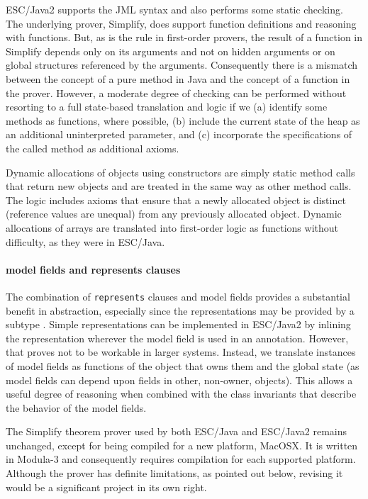 \documentclass{llncs}
\begin{document}
ESC/Java2 supports the JML syntax and also performs some static
checking.  The underlying prover, Simplify, does support function
definitions and reasoning with functions.  But, as is the rule in
first-order provers, the result of a function in Simplify depends only on its
arguments and not on hidden arguments or on global structures
referenced by the arguments.  Consequently there is a mismatch between
the concept of a pure method in Java and the concept of a function in
the prover.  However, a moderate degree of checking can be performed
without resorting to a full state-based translation and logic if we
(a) identify some methods as functions, where possible, (b) include
the current state of the heap as an additional uninterpreted
parameter, and (c) incorporate the specifications of the called method
as additional axioms.

Dynamic allocations of objects using constructors are simply static
method calls that return new objects and are treated 
in the same way as other method calls.  The logic 
includes axioms that ensure that a newly allocated object is distinct (reference values
are unequal) from any previously allocated object.  Dynamic allocations of
arrays are translated into first-order logic as functions without
difficulty, as they were in ESC/Java.

\paragraph*{model fields and represents clauses}
The combination of \texttt{represents} clauses and model fields
provides a substantial benefit in abstraction, especially since the
representations may be provided by a subtype \cite{Cheon-etal03}.
Simple representations can be implemented in ESC/Java2 by inlining the
representation wherever the model field is used in an annotation.
However, that proves not to be workable in larger systems.  Instead,
we translate instances of model fields as functions of the object that
owns them and the global state (as model fields can depend upon fields
in other, non-owner, objects).  This allows a useful degree of
reasoning when combined with the class invariants that describe the
behavior of the model fields.

The Simplify theorem prover used by both ESC/Java and ESC/Java2 remains unchanged,
except for being compiled for a new platform, MacOSX.  It is written in Modula-3
and consequently requires compilation for each supported platform.  Although the prover
has definite limitations, as pointed out below, revising it would be a significant project in
its own right.
\end{document}

